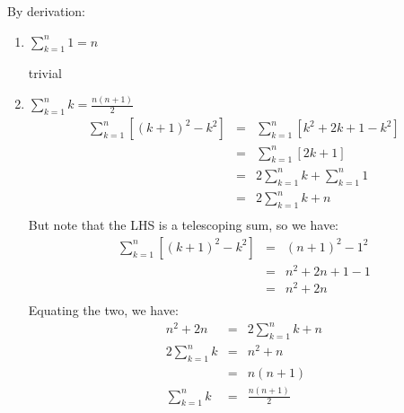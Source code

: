 \documentclass[letterpaper,12pt,fleqn]{article}
\begin{document}
\begin{theproof}
By derivation:
\begin{enumerate}
\item $\sum_{k=1}^n1=n$

trivial

\bigskip

\item $\sum_{k=1}^nk=\frac{n(n+1)}{2}$ \\
\begin{eqnarray*}
\sum_{k=1}^n[(k+1)^2-k^2] &=& \sum_{k=1}^n[k^2+2k+1-k^2] \\
    &=& \sum_{k=1}^n[2k+1] \\
    &=& 2\sum_{k=1}^nk+\sum_{k=1}^n1 \\
    &=& 2\sum_{k=1}^nk+n \\
\end{eqnarray*}
But note that the LHS is a telescoping sum, so we have:
\begin{eqnarray*}
\sum_{k=1}^n[(k+1)^2-k^2] &=& (n+1)^2-1^2 \\
    &=& n^2+2n+1-1 \\
    &=& n^2+2n \\
\end{eqnarray*}
Equating the two, we have:
\begin{eqnarray*}
n^2+2n &=& 2\sum_{k=1}^nk+n \\
2\sum_{k=1}^nk &=& n^2+n \\
    &=& n(n+1) \\
\sum_{k=1}^nk &=& \frac{n(n+1)}{2} \\
\end{eqnarray*}


\end{enumerate}
\end{theproof}
\end{document}
